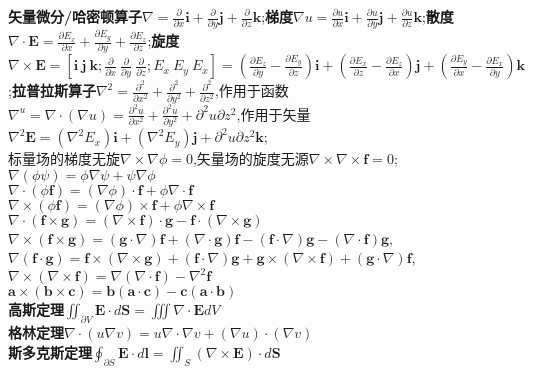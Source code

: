 \documentclass[10pt,a4paper]{article}
\begin{document}
\noindent\textbf{矢量微分/哈密顿算子}$\nabla=\frac{\partial}{\partial x}\bm{i}+\frac{\partial}{\partial y}\bm{j}+\frac{\partial}{\partial z}\bm{k}$;\textbf{梯度}$\nabla u=\frac{\partial u}{\partial x}\bm{i}+\frac{\partial u}{\partial y}\bm{j}+\frac{\partial u}{\partial z}\bm{k}$;\textbf{散度}$\nabla\cdot\bm{E}=\frac{\partial E_x}{\partial x}+\frac{\partial E_y}{\partial y}+\frac{\partial E_z}{\partial z}$;\textbf{旋度}$\nabla\times\bm{E}=[\bm{i}~\bm{j}~\bm{k};\frac{\partial}{\partial x}~\frac{\partial}{\partial y}~\frac{\partial}{\partial z};E_x~E_y~E_x]=(\frac{\partial E_z}{\partial y}-\frac{\partial E_y}{\partial z})\bm{i}+(\frac{\partial E_x}{\partial z}-\frac{\partial E_z}{\partial x})\bm{j}+(\frac{\partial E_y}{\partial x}-\frac{\partial E_x}{\partial y})\bm{k}$;\textbf{拉普拉斯算子}$\nabla^2=\frac{\partial^2}{\partial x^2}+\frac{\partial^2}{\partial y^2}+\frac{\partial^2}{\partial z^2}$,作用于函数$\nabla^u=\nabla\cdot(\nabla u)=\frac{\partial^2u}{\partial x^2}+\frac{\partial^2u}{\partial y^2}+{\partial^2u}{\partial z^2}$,作用于矢量$\nabla^2\bm{E}=(\nabla^2E_x)\bm{i}+(\nabla^2E_y)\bm{j}+{\partial^2u}{\partial z^2}\bm{k}$;\\
标量场的梯度无旋$\nabla\times\nabla\phi=0$,矢量场的旋度无源$\nabla\times\nabla\times\bm{f}=0$;\\
$\nabla(\phi\psi)=\phi\nabla\psi+\psi\nabla\phi$\\
$\nabla\cdot(\phi\bm{f})=(\nabla\phi)\cdot\bm{f}+\phi\nabla\cdot\bm{f}$\\
$\nabla\times(\phi\bm{f})=(\nabla\phi)\times\bm{f}+\phi\nabla\times\bm{f}$\\
$\nabla\cdot(\bm{f}\times\bm{g})=(\nabla\times\bm{f})\cdot\bm{g}-\bm{f}\cdot(\nabla\times\bm{g})$\\
$\nabla\times(\bm{f}\times\bm{g})=(\bm{g}\cdot\nabla)\bm{f}+(\nabla\cdot\bm{g})\bm{f}-(\bm{f}\cdot\nabla)\bm{g}-(\nabla\cdot\bm{f})\bm{g}$,$\nabla(\bm{f}\cdot\bm{g})=\bm{f}\times(\nabla\times\bm{g})+(\bm{f}\cdot\nabla)\bm{g}+\bm{g}\times(\nabla\times\bm{f})+(\bm{g}\cdot\nabla)\bm{f}$,$\nabla\times(\nabla\times\bm{f})=\nabla(\nabla\cdot\bm{f})-\nabla^2\bm{f}$\\
$\bm{a}\times(\bm{b}\times\bm{c})=\bm{b}(\bm{a}\cdot\bm{c})-\bm{c}(\bm{a}\cdot\bm{b})$\\
\textbf{高斯定理}$\iint_{\partial V}\bm{E}\cdot d\bm{S}=\iiint\nabla\cdot\bm{E}dV$\\
\textbf{格林定理}$\nabla\cdot(u\nabla v)=u\nabla\cdot\nabla v+(\nabla u)\cdot(\nabla v)$\\
\textbf{斯多克斯定理}$\oint_{\partial S}\bm{E}\cdot d\bm{l}=\iint_S(\nabla\times\bm{E})\cdot d\bm{S}$
\end{document}
